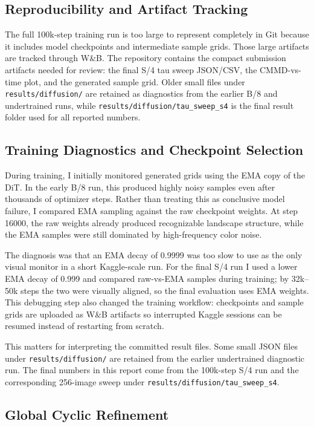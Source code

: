 \documentclass{article}
\begin{document}
\subsection{Reproducibility and Artifact Tracking}

The full 100k-step training run is too large to represent completely in Git
because it includes model checkpoints and intermediate sample grids. Those
large artifacts are tracked through W\&B. The repository contains the compact
submission artifacts needed for review: the final S/4 tau sweep JSON/CSV,
the CMMD-vs-time plot, and the generated sample grid. Older small files under
\texttt{results/diffusion/} are retained as diagnostics from the earlier B/8
and undertrained runs, while \texttt{results/diffusion/tau\_sweep\_s4} is the
final result folder used for all reported numbers.

\subsection{Training Diagnostics and Checkpoint Selection}

During training, I initially monitored generated grids using the EMA copy of
the DiT. In the early B/8 run, this produced highly noisy samples even after
thousands of optimizer steps. Rather than treating this as conclusive model
failure, I compared EMA sampling against the raw checkpoint weights. At step
16000, the raw weights already produced recognizable landscape structure, while
the EMA samples were still dominated by high-frequency color noise.

The diagnosis was that an EMA decay of 0.9999 was too slow to use as the only
visual monitor in a short Kaggle-scale run. For the final S/4 run I used a
lower EMA decay of 0.999 and compared raw-vs-EMA samples during training; by
32k--50k steps the two were visually aligned, so the final evaluation uses EMA
weights. This debugging step also changed the training workflow: checkpoints
and sample grids are uploaded as W\&B artifacts so interrupted Kaggle sessions
can be resumed instead of restarting from scratch.

This matters for interpreting the committed result files. Some small JSON files
under \texttt{results/diffusion/} are retained from the earlier undertrained
diagnostic run. The final numbers in this report come from the 100k-step S/4
run and the corresponding 256-image sweep under
\texttt{results/diffusion/tau\_sweep\_s4}.

\subsection{Global Cyclic Refinement}
\end{document}
